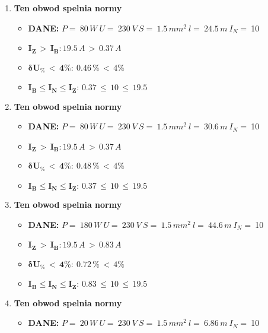 \begin{enumerate}
\begin{itemize}
\end{itemize}
\item \textcolor{Green}{\cmark} \textbf{Ten obwod spelnia normy} 
\begin{itemize}
\item[] \textbf{DANE: } \: $ P = \:80\, W\: U = \:230\: V\: S = \:1.5\, mm^2\: l = \:24.5\, m\: I_N= \: $10
\item[\textcolor{Green}{\cmark}] $ \pmb{I_Z \, >  \, I_B: }19.5 \, A \, > \,0.37 \, A $
\item[\textcolor{Green}{\cmark}] $ \pmb{ \delta U_\% \, < \, 4\%:} \:0.46 \, \% \,< \, 4\% $
\item[\textcolor{Green}{\cmark}] $ \pmb{I_B \le I_N \le I_Z: } \, 0.37 \, \le \,10 \, \le \,19.5 $
\end{itemize}
\item \textcolor{Green}{\cmark} \textbf{Ten obwod spelnia normy} 
\begin{itemize}
\item[] \textbf{DANE: } \: $ P = \:80\, W\: U = \:230\: V\: S = \:1.5\, mm^2\: l = \:30.6\, m\: I_N= \: $10
\item[\textcolor{Green}{\cmark}] $ \pmb{I_Z \, >  \, I_B: }19.5 \, A \, > \,0.37 \, A $
\item[\textcolor{Green}{\cmark}] $ \pmb{ \delta U_\% \, < \, 4\%:} \:0.48 \, \% \,< \, 4\% $
\item[\textcolor{Green}{\cmark}] $ \pmb{I_B \le I_N \le I_Z: } \, 0.37 \, \le \,10 \, \le \,19.5 $
\end{itemize}
\item \textcolor{Green}{\cmark} \textbf{Ten obwod spelnia normy} 
\begin{itemize}
\item[] \textbf{DANE: } \: $ P = \:180\, W\: U = \:230\: V\: S = \:1.5\, mm^2\: l = \:44.6\, m\: I_N= \: $10
\item[\textcolor{Green}{\cmark}] $ \pmb{I_Z \, >  \, I_B: }19.5 \, A \, > \,0.83 \, A $
\item[\textcolor{Green}{\cmark}] $ \pmb{ \delta U_\% \, < \, 4\%:} \:0.72 \, \% \,< \, 4\% $
\item[\textcolor{Green}{\cmark}] $ \pmb{I_B \le I_N \le I_Z: } \, 0.83 \, \le \,10 \, \le \,19.5 $
\end{itemize}
\item \textcolor{Green}{\cmark} \textbf{Ten obwod spelnia normy} 
\begin{itemize}
\item[] \textbf{DANE: } \: $ P = \:20\, W\: U = \:230\: V\: S = \:1.5\, mm^2\: l = \:6.86\, m\: I_N= \: $10

\end{itemize}
\end{enumerate}
